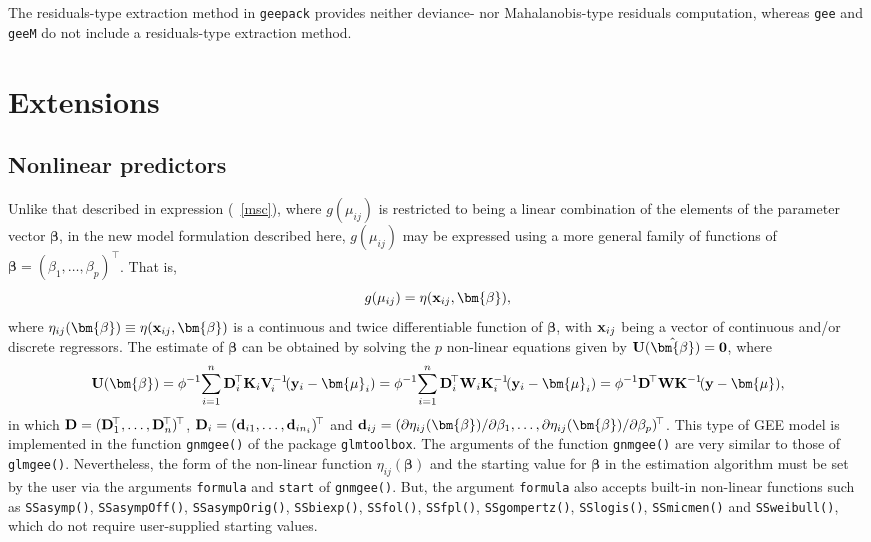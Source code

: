 The residuals-type extraction method in {\tt geepack} provides neither deviance- nor Mahalanobis-type residuals computation, whereas {\tt gee} and {\tt geeM} do not include a residuals-type extraction method.

\section{Extensions}
\subsection{Nonlinear predictors}
Unlike that described in expression (\!~\ref{msc}), where $g(\mu_{ij})$ is restricted to being a linear combination of the elements of the parameter vector $\bm{\beta}$, in the new model formulation described here, $g(\mu_{ij})$ may be expressed using a more general family of functions of $\bm{\beta}=(\beta_1,\ldots,\beta_p)^{\!\top}$. That is, $$g(\mu_{ij})=\eta({\bf x}_{ij},\bm{\beta}),$$
where $\eta_{ij}(\bm{\beta})\equiv\eta({\bf x}_{ij},\bm{\beta})$ is a continuous and twice differentiable function of $\bm{\beta}$, with ${\bf x}_{ij}$ being a vector of continuous and/or discrete regressors. The estimate of $\bm{\beta}$ can be obtained by solving the $p$ non-linear equations given by ${\bf U}(\hat{\bm{\beta}})={\bf 0}$, where
\begin{equation}\notag
{\bf U}(\bm{\beta})=\phi^{-1}\!\sum\limits_{i=1}^n{\bf D}_i^{\!\top}{\bf K}_i{\bf V}_{\!i}^{-1}\!({\bf y}_i-\bm{\mu}_i)=\phi^{-1}\!\sum\limits_{i=1}^n{\bf D}_i^{\!\top}{\bf W}_i{\bf K}_i^{-1}\!({\bf y}_i-\bm{\mu}_i)=\phi^{-1}{\bf D}^{\!\top}{\bf W}{\bf K}^{-1}\!({\bf y}-\bm{\mu}),
\end{equation}
in which ${\bf D}=({\bf D}^{\!\top}_1,\ldots,{\bf D}^{\!\top}_n)^{\!\top}$, ${\bf D}_i=({\bf d}_{i1},\ldots,{\bf d}_{in_i})^{\!\top}$ and ${\bf d}_{ij}=(\partial \eta_{ij}(\bm{\beta})/\partial \beta_1,\ldots,\partial \eta_{ij}(\bm{\beta})/\partial \beta_p)^{\!\top}$. This type of GEE model is implemented in the function {\tt gnmgee()} of the package {\tt glmtoolbox}. The arguments of the function {\tt gnmgee()} are very similar to those of {\tt glmgee()}. Nevertheless, the form of the non-linear function $\eta_{ij}(\bm{\beta})$ and the starting value for $\bm{\beta}$ in the estimation algorithm must be set by the user via the arguments {\tt formula} and {\tt start} of {\tt gnmgee()}. But, the argument {\tt formula} also accepts built-in non-linear functions such as {\tt SSasymp()}, {\tt SSasympOff()}, {\tt SSasympOrig()}, {\tt SSbiexp()}, {\tt SSfol()}, {\tt SSfpl()}, {\tt SSgompertz()}, {\tt SSlogis()}, {\tt SSmicmen()} and {\tt SSweibull()}, which do not require user-supplied starting values.

